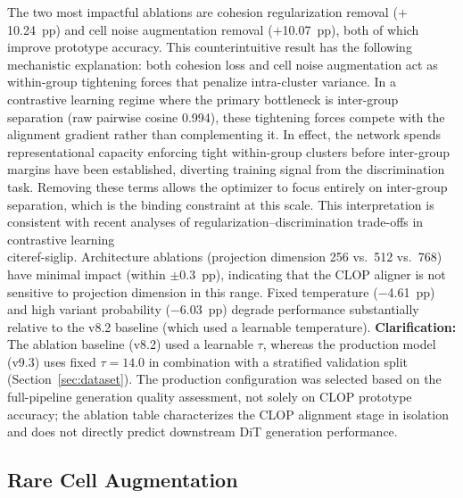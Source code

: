 \documentclass[biology,article,submit,pdftex,moreauthors]{Definitions/mdpi}
\begin{document}
The two most impactful ablations are cohesion regularization removal ($+$10.24~pp) and cell noise augmentation removal ($+$10.07~pp), both of which improve prototype accuracy. This counterintuitive result has the following mechanistic explanation: both cohesion loss and cell noise augmentation act as within-group tightening forces that penalize intra-cluster variance. In a contrastive learning regime where the primary bottleneck is inter-group separation (raw pairwise cosine 0.994), these tightening forces compete with the alignment gradient rather than complementing it. In effect, the network spends representational capacity enforcing tight within-group clusters before inter-group margins have been established, diverting training signal from the discrimination task. Removing these terms allows the optimizer to focus entirely on inter-group separation, which is the binding constraint at this scale. This interpretation is consistent with recent analyses of regularization--discrimination trade-offs in contrastive learning~\\cite{ref-siglip}. Architecture ablations (projection dimension 256 vs.\ 512 vs.\ 768) have minimal impact (within $\pm$0.3~pp), indicating that the CLOP aligner is not sensitive to projection dimension in this range. Fixed temperature ($-$4.61~pp) and high variant probability ($-$6.03~pp) degrade performance substantially relative to the v8.2 baseline (which used a learnable temperature). \textbf{Clarification:} The ablation baseline (v8.2) used a learnable $\tau$, whereas the production model (v9.3) uses fixed $\tau = 14.0$ in combination with a stratified validation split (Section~\ref{sec:dataset}). The production configuration was selected based on the full-pipeline generation quality assessment, not solely on CLOP prototype accuracy; the ablation table characterizes the CLOP alignment stage in isolation and does not directly predict downstream DiT generation performance.

\subsection{Rare Cell Augmentation}\label{sec:rare-cell}
\end{document}

